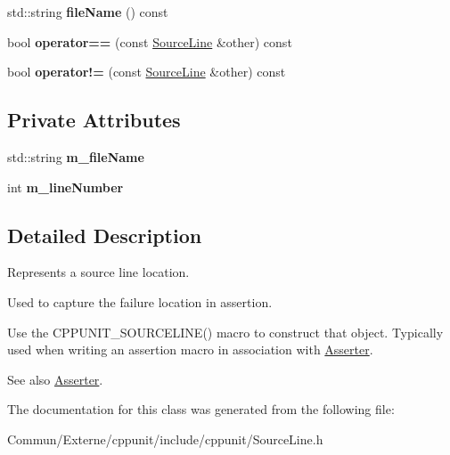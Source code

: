 \begin{DoxyCompactItemize}
\item 
std\+::string {\bfseries file\+Name} () const \hypertarget{class_source_line_a1571a51d45ebcea382b86224ef767a2e}{}\label{class_source_line_a1571a51d45ebcea382b86224ef767a2e}

\item 
bool {\bfseries operator==} (const \hyperlink{class_source_line}{Source\+Line} \&other) const \hypertarget{class_source_line_a6c9eff68161f364725b3a51fc60c3e01}{}\label{class_source_line_a6c9eff68161f364725b3a51fc60c3e01}

\item 
bool {\bfseries operator!=} (const \hyperlink{class_source_line}{Source\+Line} \&other) const \hypertarget{class_source_line_aa4633f46f9c9f470c6b680327d002e86}{}\label{class_source_line_aa4633f46f9c9f470c6b680327d002e86}

\end{DoxyCompactItemize}
\subsection*{Private Attributes}
\begin{DoxyCompactItemize}
\item 
std\+::string {\bfseries m\+\_\+file\+Name}\hypertarget{class_source_line_af10bb96c2ba0e4ed095f7e129a44ec18}{}\label{class_source_line_af10bb96c2ba0e4ed095f7e129a44ec18}

\item 
int {\bfseries m\+\_\+line\+Number}\hypertarget{class_source_line_a362c1b52f32008810b41e70ffd28231c}{}\label{class_source_line_a362c1b52f32008810b41e70ffd28231c}

\end{DoxyCompactItemize}


\subsection{Detailed Description}
Represents a source line location.

Used to capture the failure location in assertion. 

Use the C\+P\+P\+U\+N\+I\+T\+\_\+\+S\+O\+U\+R\+C\+E\+L\+I\+N\+E() macro to construct that object. Typically used when writing an assertion macro in association with \hyperlink{struct_asserter}{Asserter}.

\begin{DoxySeeAlso}{See also}
\hyperlink{struct_asserter}{Asserter}. 
\end{DoxySeeAlso}


The documentation for this class was generated from the following file\+:\begin{DoxyCompactItemize}
\item 
Commun/\+Externe/cppunit/include/cppunit/Source\+Line.\+h\end{DoxyCompactItemize}

